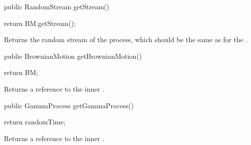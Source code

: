 \begin{code}

   public RandomStream getStream()\begin{hide} {
        return BM.getStream();
   }\end{hide}
\end{code}
\begin{tabb}
Returns the random stream of the  process, which should
be the same as for the .
\end{tabb}
\begin{code}

   public BrownianMotion getBrownianMotion() \begin{hide} {
      return BM;
   }\end{hide}
\end{code}
\begin{tabb}
Returns a reference to the inner .
\end{tabb}
\begin{code}

   public GammaProcess getGammaProcess() \begin{hide} {
      return randomTime;
   }\end{hide}
\end{code}
\begin{tabb}
Returns a reference to the inner .
\end{tabb}
\begin{code}\begin{hide}
}
\end{hide}
\end{code}
